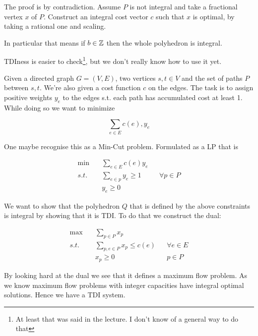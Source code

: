 \begin{pr} The proof is by contradiction. Assume $P$ is not integral and take a fractional vertex $x$ of $P$. Construct an integral cost vector $c$ such that $x$ is optimal, by taking a rational one and scaling.

In particular that means if $b\in \mathbb{Z}$ then the whole polyhedron is integral.
\end{pr}

TDIness is easier to check\footnote{At least that was said in the lecture. I don't know of a general way to do that}, but we don't really know how to use it yet.

\begin{Ex} Given a directed graph $G=(V,E)$, two vertices $s,t\in V$ and the set of paths $P$ between $s,t$. We're also given a cost function $c$ on the edges. The task is to assign positive weights $y_e$ to the edges s.t. each path has accumulated cost at least 1. While doing so we want to minimize

\[\sum_{e\in E} c(e), y_e\]

One maybe recognise this as a Min-Cut problem. Formulated as a LP that is 

\begin{align*}
\min \quad & \sum_{e\in E} c(e) y_e\\
s.t. & \sum_{e\in p} y_e \geq 1 && \forall p\in P\\
&y_e \geq 0
\end{align*}

We want to show that the polyhedron $Q$ that is defined by the above constraints is integral by showing that it is TDI. To do that we construct the dual:

\begin{align*}
\max \quad & \sum_{p\in P} x_p\\
s.t. & \sum_{p,e\in P} x_p \leq c(e) && \forall e\in E\\
 & x_p \geq 0 && p\in P
\end{align*}

By looking hard at the dual we see that it defines a maximum flow problem. As we know maximum flow problems with integer capacities have integral optimal solutions. Hence we have a TDI system.
\end{Ex}